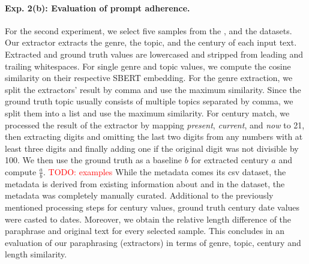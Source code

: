 \paragraph{Exp. 2(b): Evaluation of prompt adherence.}
For the second experiment, we select five samples from the \dataBlog{}, \dataGutenberg{} and the \dataStudent{} datasets. 
Our extractor extracts the genre, the topic, and the century of each input text.
Extracted and ground truth values are lowercased and stripped from leading and trailing whitespaces. 
For single genre and topic values, we compute the cosine similarity on their respective SBERT embedding.
For the genre extraction, we split the extractors' result by comma and use the maximum similarity.
Since the ground truth topic usually consists of multiple topics separated by comma, we split them into a list and use the maximum similarity.
For century match, we processed the result of the extractor by mapping \textit{present}, \textit{current}, and \textit{now} to 21, then extracting digits and omitting the last two digits from any numbers with at least three digits and finally adding one if the original digit was not divisible by 100.
We then use the ground truth as a baseline $b$ for extracted century $a$ and compute $\frac{a}{b}$.
\textcolor{red}{TODO: examples}
While the \dataBlog{} metadata comes its csv dataset, the \dataStudent{} metadata is derived from existing information about and in the dataset, the \dataGutenberg{} metadata was completely manually curated.
Additional to the previously mentioned processing steps for century values, ground truth century date values were casted to dates.
Moreover, we obtain the relative length difference of the paraphrase and original text for every selected sample. 
This concludes in an evaluation of our paraphrasing (extractors) in terms of genre, topic, century and length similarity.